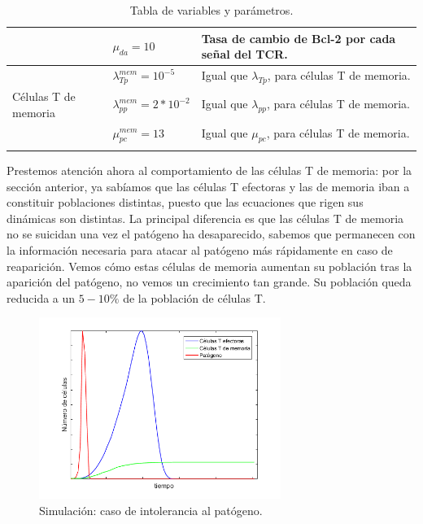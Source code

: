 \begin{table}[h]
\begin{center}
\begin{tabular}{>{\centering\arraybackslash}m{2cm} >{\arraybackslash}m{3cm} >{\arraybackslash}m{7cm} }
			& $\mu_{da} = 10$                 & Tasa de cambio de Bcl-2 por cada señal del TCR.           \\ \hline
			\multirow{4}{*}{} & $\lambda_{Tp}^{mem} = 10^{-5}$   & Igual que $\lambda_{Tp}$, para células T de memoria.      \\ \cline{2-3}
			Células T de memoria        & $\lambda_{pp}^{mem} = 2*10^{-2}$ & Igual que $\lambda_{pp}$, para células T de memoria.      \\ \cline{2-3}
			& $\mu_{pc}^{mem} = 13$           & Igual que $\mu_{pc}$, para células T de memoria.          \\ \cline{2-3}\hline
		\end{tabular}
		\caption{Tabla de variables y parámetros.}
		\label{tabla:param}
	\end{center}
\end{table}


Prestemos atención ahora al comportamiento de las células T de memoria: por la sección anterior, ya sabíamos que las células T efectoras y las de memoria iban a constituir poblaciones distintas, puesto que las ecuaciones que rigen sus dinámicas son distintas. La principal diferencia es que las células T de memoria no se suicidan una vez el patógeno ha desaparecido, sabemos que permanecen con la información necesaria para atacar al patógeno más rápidamente en caso de reaparición. Vemos cómo estas células de memoria aumentan su población tras la aparición del patógeno, no vemos un crecimiento tan grande. Su población queda reducida a un $5-10\%$ de la población de células T.


\begin{figure}[t]
	\centering
	\includegraphics[width=0.7\textwidth]{Imagenes/Simulaciones/intolerance}
	\caption{Simulación: caso de intolerancia al patógeno.}
	\label{fig:intolerance}
\end{figure}

